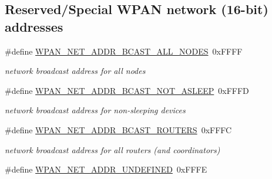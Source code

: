 \subsection*{Reserved/\-Special W\-P\-A\-N network (16-\/bit) addresses}
\begin{DoxyCompactItemize}
\item 
\hypertarget{group__wpan__types_ga6865088a83d5dbd67d9185fbe0d25063}{\#define \hyperlink{group__wpan__types_ga6865088a83d5dbd67d9185fbe0d25063}{W\-P\-A\-N\-\_\-\-N\-E\-T\-\_\-\-A\-D\-D\-R\-\_\-\-B\-C\-A\-S\-T\-\_\-\-A\-L\-L\-\_\-\-N\-O\-D\-E\-S}~0x\-F\-F\-F\-F}\label{group__wpan__types_ga6865088a83d5dbd67d9185fbe0d25063}

\begin{DoxyCompactList}\small\item\em network broadcast address for all nodes \end{DoxyCompactList}\item 
\hypertarget{group__wpan__types_ga08ec03f67d0d74ba6f98da543baee129}{\#define \hyperlink{group__wpan__types_ga08ec03f67d0d74ba6f98da543baee129}{W\-P\-A\-N\-\_\-\-N\-E\-T\-\_\-\-A\-D\-D\-R\-\_\-\-B\-C\-A\-S\-T\-\_\-\-N\-O\-T\-\_\-\-A\-S\-L\-E\-E\-P}~0x\-F\-F\-F\-D}\label{group__wpan__types_ga08ec03f67d0d74ba6f98da543baee129}

\begin{DoxyCompactList}\small\item\em network broadcast address for non-\/sleeping devices \end{DoxyCompactList}\item 
\hypertarget{group__wpan__types_gabc1252917f345a50aa97f991bb7a3685}{\#define \hyperlink{group__wpan__types_gabc1252917f345a50aa97f991bb7a3685}{W\-P\-A\-N\-\_\-\-N\-E\-T\-\_\-\-A\-D\-D\-R\-\_\-\-B\-C\-A\-S\-T\-\_\-\-R\-O\-U\-T\-E\-R\-S}~0x\-F\-F\-F\-C}\label{group__wpan__types_gabc1252917f345a50aa97f991bb7a3685}

\begin{DoxyCompactList}\small\item\em network broadcast address for all routers (and coordinators) \end{DoxyCompactList}\item 
\hypertarget{group__wpan__types_ga1674d7b825e528a482725d1c06b02c10}{\#define \hyperlink{group__wpan__types_ga1674d7b825e528a482725d1c06b02c10}{W\-P\-A\-N\-\_\-\-N\-E\-T\-\_\-\-A\-D\-D\-R\-\_\-\-U\-N\-D\-E\-F\-I\-N\-E\-D}~0x\-F\-F\-F\-E}\label{group__wpan__types_ga1674d7b825e528a482725d1c06b02c10}


\end{DoxyCompactItemize}
